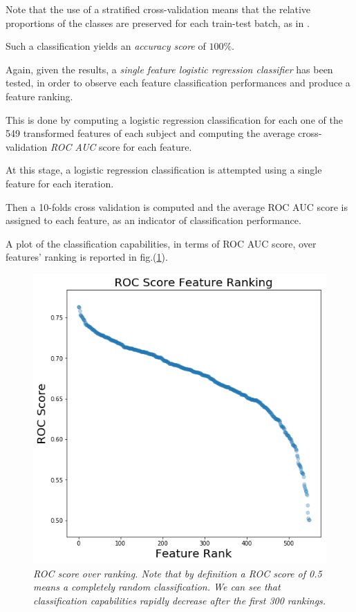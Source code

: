 \documentclass[12pt,openright,twoside,a4paper]{book}
\begin{document}
Note that the use of  a stratified cross-validation means that the relative proportions of the classes are preserved for each train-test batch, as in \cite{ESL}.

Such a classification yields  an\textit{ accuracy score} of $100\%$.
\vspace{5mm}

Again, given the results, a \textit{single feature logistic regression classifier} has been tested, in order to observe each feature classification performances and produce a feature ranking.

This is done by computing a logistic regression classification for each one of the 549 transformed features of each subject and computing the average cross-validation \textit{ROC AUC} score for each feature.

At this stage, a logistic regression classification is attempted using a single feature for each iteration.

Then a 10-folds cross validation is computed and the average ROC AUC score is assigned to each feature, as an indicator of classification performance.

A plot of the  classification capabilities, in terms of ROC AUC score, over features' ranking is reported in fig.(\ref{ADNI-frank}). 

\begin{figure}[!h]
\centering
\includegraphics[scale=0.5]{ROC-feature-rank}
\caption{\textit{ROC score over ranking. Note that by definition a ROC score of 0.5 means a completely random classification. We can see that classification capabilities rapidly decrease after the first 300 rankings.}}
\label{ADNI-frank}
\end{figure}
\end{document}
